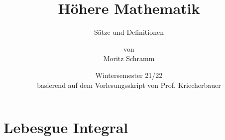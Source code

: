 \documentclass[a4paper, 12pt]{report}
\institute{Universität Bayreuth}
\title{Höhere Mathematik}
\subtitle{Sätze und Definitionen}
\author{von\\Moritz Schramm}%
\date{Wintersemester 21/22\\ \small basierend auf dem Vorlesungsskript von Prof. Kriecherbauer}
\begin{document}
	\maketitle
	\romantableofcontents
	
	\chapter{Lebesgue Integral}
	
	
	
\end{document}
